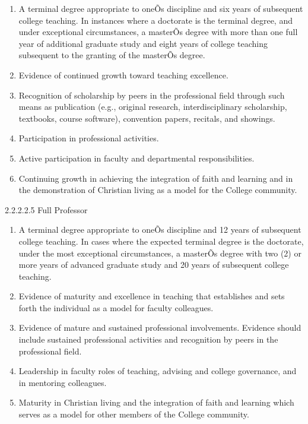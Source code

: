 \documentclass[letterpaper, 11pt]{article}
\begin{document}
				\begin{enumerate}[label=\alph*)]
					\item{A terminal degree appropriate to oneÕs discipline and six years of subsequent college teaching. In instances where a doctorate is the terminal degree, and under exceptional circumstances, a masterÕs degree with more than one full year of additional graduate study and eight years of college teaching subsequent to the granting of the masterÕs degree.}
					\item{Evidence of continued growth toward teaching excellence.}
					\item{Recognition of scholarship by peers in the professional field through such means as publication (e.g., original research, interdisciplinary scholarship, textbooks, course software), convention papers, recitals, and showings.}
					\item{Participation in professional activities.}
					\item{Active participation in faculty and departmental responsibilities.}
					\item{Continuing growth in achieving the integration of faith and learning and in the demonstration of Christian living as a model for the College community.}
				\end{enumerate}
				2.2.2.2.5 Full Professor
				\begin{enumerate}[label=\alph*)]
					\item{A terminal degree appropriate to oneÕs discipline and 12 years of subsequent college teaching. In cases where the expected terminal degree is the doctorate, under the most exceptional circumstances, a masterÕs degree with two (2) or more years of advanced graduate study and 20 years of subsequent college teaching.}
					\item{Evidence of maturity and excellence in teaching that establishes and sets forth the individual as a model for faculty colleagues.}
					\item{Evidence of mature and sustained professional involvements. Evidence should include sustained professional activities and recognition by peers in the professional field.}
					\item{Leadership in faculty roles of teaching, advising and college governance, and in mentoring colleagues.}
					\item{Maturity in Christian living and the integration of faith and learning which serves as a model for other members of the College community.}
				\end{enumerate}
\end{document}
